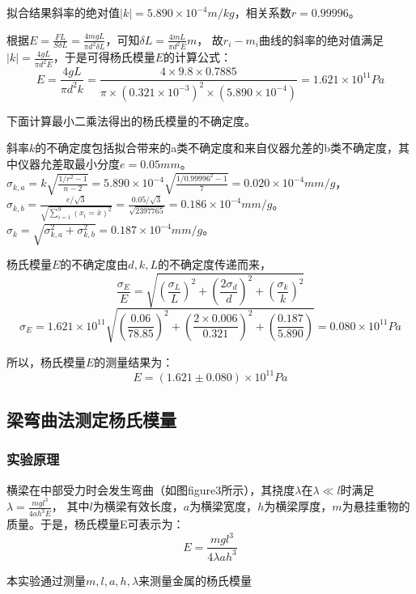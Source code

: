 \documentclass{article}
\begin{document}
    拟合结果斜率的绝对值$|k|=5.890\times 10^{-4}m/kg$，相关系数$r=0.99996$。

    根据$E=\frac{FL}{S\delta L}=\frac{4mgL}{\pi d^2 \delta L}$，可知$\delta L=\frac{4mL}{\pi d^2 E}m$，
    故$r_i-m_i$曲线的斜率的绝对值满足$|k|=\frac{4gL}{\pi d^2 E}$，于是可得杨氏模量$E$的计算公式：
    $$E=\frac{4gL}{\pi d^2 k}=\frac{4\times 9.8\times 0.7885}{\pi \times (0.321\times 10^{-3})^2\times (5.890\times 10^{-4})}=1.621\times 10^{11}Pa$$

    下面计算最小二乘法得出的杨氏模量的不确定度。

    斜率$k$的不确定度包括拟合带来的a类不确定度和来自仪器允差的b类不确定度，其中仪器允差取最小分度$e=0.05mm$。$\sigma_{k,a}=k\sqrt{\frac{1/r^2-1}{n-2}}=5.890\times 10^{-4}\sqrt{\frac{1/0.99996^2-1}{7}}=0.020\times 10^{-4}mm/g$，
    $\sigma_{k,b}=\frac{e/\sqrt{3}}{\sqrt{\sum_{i=1}^9 (x_i=\bar{x})^2}}=\frac{0.05/\sqrt{3}}{\sqrt{2397765}}=0.186\times 10^{-4}mm/g$。$\sigma_k=\sqrt{\sigma_{k,a}^2+\sigma_{k,b}^2}=0.187\times 10^{-4}mm/g$。

    杨氏模量$E$的不确定度由$d,k,L$的不确定度传递而来，
    $$\frac{\sigma_E}{E}=\sqrt{(\frac{\sigma_L}{L})^2+(\frac{2\sigma_d}{d})^2+(\frac{\sigma_k}{k})^2}$$
    $$\sigma_E=1.621\times 10^{11} \sqrt{(\frac{0.06}{78.85})^2+(\frac{2\times 0.006}{0.321})^2+(\frac{0.187}{5.890})}=0.080\times 10^{11}Pa$$

    所以，杨氏模量$E$的测量结果为：
    $$E=(1.621\pm 0.080) \times 10^{11} Pa$$

    \subsection{梁弯曲法测定杨氏模量}
    \subsubsection{实验原理}
    横梁在中部受力时会发生弯曲（如图figure3所示），其挠度$\lambda$在$\lambda \ll l$时满足$\lambda=\frac{mgl^3}{4ah^3E}$，
    其中$l$为横梁有效长度，$a$为横梁宽度，$h$为横梁厚度，$m$为悬挂重物的质量。于是，杨氏模量E可表示为：
    $$E=\frac{mgl^3}{4\lambda ah^3}$$

    本实验通过测量$m,l,a,h,\lambda$来测量金属的杨氏模量
\end{document}

